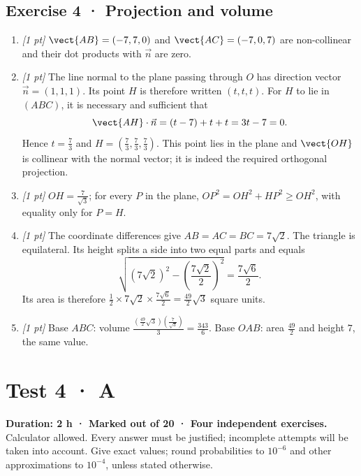 \subsection*{Exercise 4 · Projection and volume}\begin{enumerate}

\item \textit{[1 pt]} $\vect{AB}=(-7,7,0)$ and $\vect{AC}=(-7,0,7)$ are non-collinear and their dot products with $\vec n$ are zero.

\item \textit{[1 pt]} The line normal to the plane passing through $O$ has direction vector $\vec n=(1,1,1)$. Its point $H$ is therefore written $(t,t,t)$. For $H$ to lie in $(ABC)$, it is necessary and sufficient that
\[\vect{AH}\cdot\vec n=(t-7)+t+t=3t-7=0.\]
Hence $t=\frac{7}{3}$ and $H=(\frac{7}{3},\frac{7}{3},\frac{7}{3})$. This point lies in the plane and $\vect{OH}$ is collinear with the normal vector; it is indeed the required orthogonal projection.

\item \textit{[1 pt]} $OH=\frac{7}{\sqrt{3}}$; for every $P$ in the plane, $OP^2=OH^2+HP^2\ge OH^2$, with equality only for $P=H$.

\item \textit{[1 pt]} The coordinate differences give $AB=AC=BC=7\sqrt2$. The triangle is equilateral. Its height splits a side into two equal parts and equals
\[\sqrt{(7\sqrt2)^2-(\frac{7\sqrt{2}}{2})^2}=\frac{7\sqrt6}{2}.\]
Its area is therefore $\frac12\times 7\sqrt2\times\frac{7\sqrt6}{2}=\frac{49}{2}\sqrt3$ square units.

\item \textit{[1 pt]} Base $ABC$: volume $\frac{(\frac{49}{2}\sqrt3)(\frac{7}{\sqrt{3}})}{3}=\frac{343}{6}$. Base $OAB$: area $\frac{49}{2}$ and height $7$, the same value.

\end{enumerate}

\fi

\ifmxteacher

\mxnewpage{}\label{sujet:6-3}

\section*{Test 4 · A}


\textbf{Duration: 2 h · Marked out of 20 · Four independent exercises.}\\Calculator allowed. Every answer must be justified; incomplete attempts will be taken into account. Give exact values; round probabilities to $10^{-6}$ and other approximations to $10^{-4}$, unless stated otherwise.

